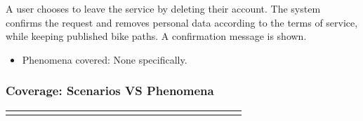 \documentclass{Configuration_Files/PoliMi3i_thesis}
\begin{document}
    A user chooses to leave the service by deleting their account. The system confirms the request and removes personal data according to the terms of service, while keeping published bike paths. A confirmation message is shown.
    
    \begin{itemize}\item{Phenomena covered: None specifically.}\end{itemize}

    \newpage

\subsubsection*{Coverage: Scenarios VS Phenomena}
        \begin{longtable}{@{}l *{23}{R{0.25cm}}@{}}
        \toprule
         &  &
         &
         &
         &
         &
         &
         &
         &
         &
         &
         &
         &
         &
         &
         &
         &
         &
         &
         &
         &
         &
         &
         \\
        \midrule
        \endfirsthead
        \toprule
         &  &
         &
         &
         &
         &
         &
         &
         &
         &
         &
         &
         &
         &
         &
         &
         &
         &
         &
         &

\end{longtable}
\end{document}
